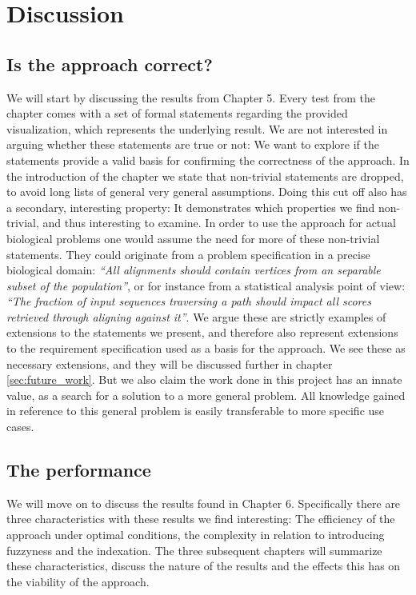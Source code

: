 \documentclass[thesis.tex]{subfiles}
\begin{document}
\chapter{Discussion}
\label{sec:discussion}
\section{Is the approach correct?}
We will start by discussing the results from Chapter 5. Every test from the chapter comes with a set of formal statements regarding the provided visualization, which represents the underlying result. We are not interested in arguing whether these statements are true or not: We want to explore if the statements provide a valid basis for confirming the correctness of the approach. In the introduction of the chapter we state that non-trivial statements are dropped, to avoid long lists of general very general assumptions. Doing this cut off also has a secondary, interesting property: It demonstrates which properties we find non-trivial, and thus interesting to examine. In order to use the approach for actual biological problems one would assume the need for more of these non-trivial statements. They could originate from a problem specification in a precise biological domain: \textit{``All alignments should contain vertices from an separable subset of the population''}, or for instance from a statistical analysis point of view: \textit{``The fraction of input sequences traversing a path should impact all scores retrieved through aligning against it''}. We argue these are strictly examples of extensions to the statements we present, and therefore also represent extensions to the requirement specification used as a basis for the approach. We see these as necessary extensions, and they will be discussed further in chapter \ref{sec:future_work}. But we also claim the work done in this project has an innate value, as a search for a solution to a more general problem. All knowledge gained in reference to this general problem is easily transferable to more specific use cases.
\section{The performance}
We will move on to discuss the results found in Chapter 6. Specifically there are three characteristics with these results we find interesting: The efficiency of the approach under optimal conditions, the complexity in relation to introducing fuzzyness and the indexation. The three subsequent chapters will summarize these characteristics, discuss the nature of the results and the effects this has on the viability of the approach.
\end{document}
